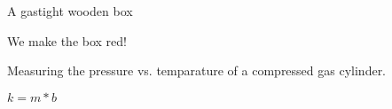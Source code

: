 \documentclass{article}
\begin{document}
\begin{module}[id=thermostatics,uses=units]
\begin{system}[id=gas-cylinder]
  \begin{realization}A gastight wooden box\end{realization}
  \begin{preparation}We make the box red!\end{preparation}
  \begin{state}
  \end{state}
\end{system}
\begin{experiment}[id=ex-pressure-vs-temp]
  Measuring the pressure vs. temparature of a compressed gas cylinder.
  \begin{measurement}[id=m-213]
    \begin{state}[of=gas-cylinder]
    \end{state}
    \begin{state}[of=mercury-theormometer]
    \end{state}
  \end{measurement}
\end{experiment}

\begin{assertion}[id=kraftgleichung,type=natural-law]
  $k=m*b$
\end{assertion}
\end{module}
\end{document}
